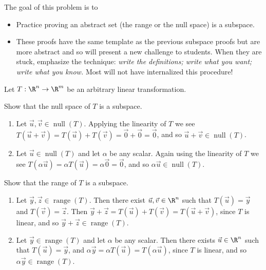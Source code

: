 \documentclass{problemset}
\DeclareMathOperator{\Range}{range}
\DeclareMathOperator{\Null}{null}
\begin{document}
	\question
	\begin{annotation}
		\begin{goals}

			The goal of this problem is to
			\begin{itemize}
				\item Practice proving an abstract set (the range or the null space) is a subspace.
			\end{itemize}
		\end{goals}

		\begin{notes}
			\begin{itemize}
				\item These proofs have the same template as the previous subspace proofs but
					are more abstract and so will present a new challenge to students. When
					they are stuck, emphasize the technique: \emph{write the definitions; write what you want; 
					write what you know.} Most will not have internalized this procedure!
			\end{itemize}
		\end{notes}
	\end{annotation}
	Let $T:\R^n\to\R^m$ be an arbitrary linear transformation.
	\begin{parts}
		\item Show that the null space of $T$ is a subspace.
			\begin{solution}
				\begin{enumerate}[label=(\roman*)]
					\item Let $\vec u,\vec v\in\Null(T)$.
						Applying the linearity of $T$ we see
						$T(\vec u+\vec v)=T(\vec u)+T(\vec v)=\vec 0+\vec 0=\vec 0$,
						and so $\vec u+\vec v\in\Null(T)$.
					\item Let $\vec u\in\Null(T)$ and let $\alpha$ be any scalar.
						Again using the linearity of $T$ we see
						$T(\alpha\vec u)=\alpha T(\vec u)=\alpha\vec 0=\vec 0$,
						and so $\alpha\vec u\in\Null(T)$.
				\end{enumerate}
			\end{solution}
		\item Show that the range of $T$ is a subspace.
			\begin{solution}
				\begin{enumerate}[label=(\roman*)]
					\item Let $\vec y,\vec z\in\Range(T)$.
						Then there exist $\vec u,\vec v\in\R^n$ such that $T(\vec u)=\vec y$
						and $T(\vec v)=\vec z$. Then
						$\vec y+\vec z=T(\vec u)+T(\vec v)=T(\vec u+\vec v)$,
						since $T$ is linear, and so $\vec y+\vec z\in\Range(T)$.
					\item Let $\vec y\in\Range(T)$ and let $\alpha$ be any scalar.
						Then there exists $\vec u\in\R^n$ such that $T(\vec u)=\vec y$,
						and $\alpha\vec y=\alpha T(\vec u)=T(\alpha\vec u)$,
						since $T$ is linear, and so $\alpha\vec y\in\Range(T)$.
				\end{enumerate}

			\end{solution}
	\end{parts}
\end{document}
